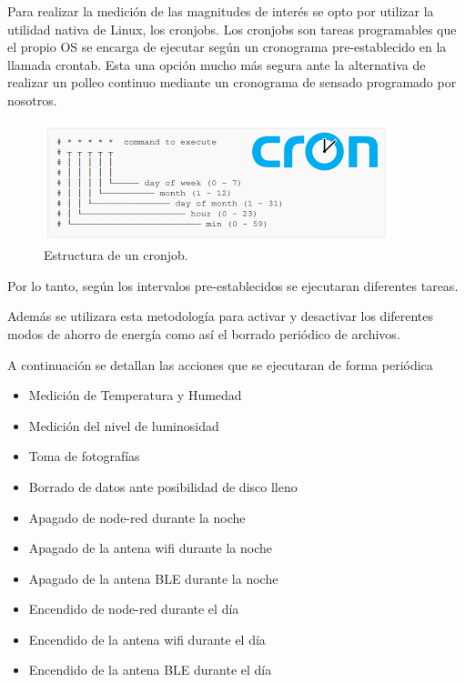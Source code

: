 Para realizar la medición de las magnitudes de interés se opto por utilizar la utilidad nativa de Linux, los cronjobs. Los cronjobs son tareas programables que el propio OS se encarga de ejecutar según un cronograma pre-establecido en la llamada crontab. Esta una opción mucho más segura ante la alternativa de realizar un polleo continuo mediante un cronograma de sensado programado por nosotros.
\begin{figure}[H]
	\centering
	\includegraphics[width=0.7\linewidth]{"../Ingenieria de Detalle/ImagenesIngenieria de Detalle/cron"}
	\caption{Estructura de un cronjob.}
	\label{fig:cron}
\end{figure}

Por lo tanto, según los intervalos pre-establecidos se ejecutaran diferentes tareas.

Además se utilizara esta metodología para activar y desactivar los diferentes modos de ahorro de energía como así el borrado periódico de archivos.

A continuación se detallan las acciones que se ejecutaran de forma periódica  
\begin{itemize}
	\item Medición de Temperatura y Humedad
	\item Medición del nivel de luminosidad
	\item Toma de fotografías
	\item Borrado de datos ante posibilidad de disco lleno
	\item Apagado de node-red durante la noche
	\item Apagado de la antena wifi durante la noche
	\item Apagado de la antena BLE durante la noche
	\item Encendido de node-red durante el día
	\item Encendido de la antena wifi durante el día
	\item Encendido de la antena BLE durante el día
\end{itemize}










